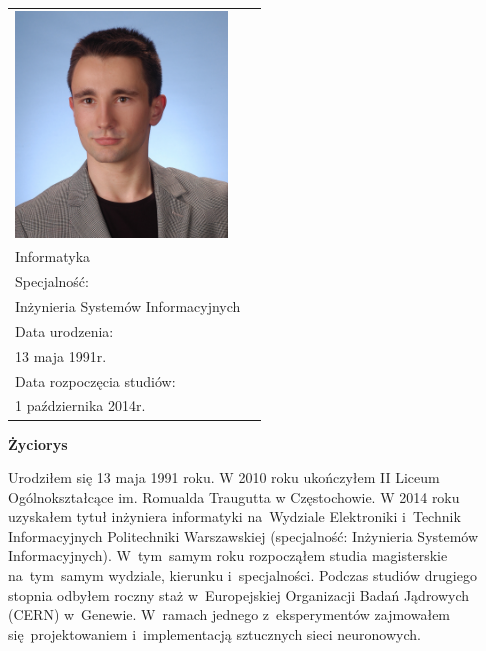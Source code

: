 \newpage\thispagestyle{empty}
  \begin{tabular}{p{6cm} p{8cm}}
      \begin{minipage}{7cm}
      \includegraphics[height=6cm, keepaspectratio]{img/author-photo.jpg}
      \end{minipage}
      &
      \begin{minipage}{8cm}
      Kierunek: \\[\smallskipamount]
      {\large Informatyka}\\[0.2cm]
      Specjalność: \\[\smallskipamount]
      {\large Inżynieria Systemów Informacyjnych}\\[0.2cm]
      Data urodzenia: \\[\smallskipamount]
      {\large 13 maja 1991r.}\\[0.2cm]
      Data rozpoczęcia studiów: \\[\smallskipamount]
      {\large 1 października 2014r.}
      \end{minipage}
  \end{tabular}
  \vspace*{1\baselineskip}
  \begin{center}
  {\large\bfseries Życiorys}\par\bigskip
  \end{center}
  Urodziłem się 13 maja 1991 roku. W 2010 roku ukończyłem II Liceum Ogólnokształcące
  im. Romualda Traugutta w Częstochowie. W 2014 roku uzyskałem tytuł inżyniera informatyki na~Wydziale Elektroniki
  i~Technik Informacyjnych Politechniki Warszawskiej (specjalność: Inżynieria Systemów Informacyjnych).
  W~tym~samym roku rozpocząłem studia magisterskie na~tym~samym wydziale, kierunku i~specjalności.
  Podczas studiów drugiego stopnia odbyłem roczny staż w~Europejskiej Organizacji Badań Jądrowych (CERN) w~Genewie.
  W~ramach jednego z~eksperymentów zajmowałem się~projektowaniem i~implementacją sztucznych sieci neuronowych.

